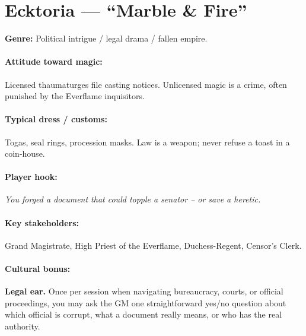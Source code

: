 \section{Ecktoria --- ``Marble \& Fire''}
\textbf{Genre:} Political intrigue / legal drama / fallen empire.

\paragraph{Attitude toward magic:} Licensed thaumaturges file casting notices. Unlicensed magic is a crime, often punished by the Everflame inquisitors.

\paragraph{Typical dress / customs:} Togas, seal rings, procession masks. Law is a weapon; never refuse a toast in a coin-house.

\paragraph{Player hook:} \emph{You forged a document that could topple a senator -- or save a heretic.}

\paragraph{Key stakeholders:} Grand Magistrate, High Priest of the Everflame, Duchess-Regent, Censor's Clerk.

\paragraph{Cultural bonus:} \textbf{Legal ear.} Once per session when navigating bureaucracy, courts, or official proceedings, you may ask the GM one straightforward yes/no question about which official is corrupt, what a document really means, or who has the real authority.

